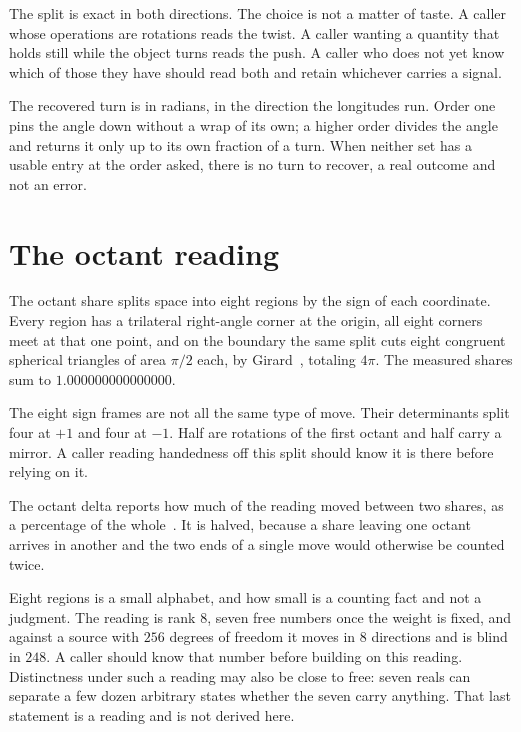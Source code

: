 The split is exact in both directions. The choice is not a matter of taste. A caller whose operations are rotations reads the twist. A caller wanting a quantity that holds still while the object turns reads the push. A caller who does not yet know which of those they have should read both and retain whichever carries a signal.

The recovered turn is in radians, in the direction the longitudes run. Order one pins the angle down without a wrap of its own; a higher order divides the angle and returns it only up to its own fraction of a turn. When neither set has a usable entry at the order asked, there is no turn to recover, a real outcome and not an error.

\section{The octant reading}

The octant share splits space into eight regions by the sign of each coordinate. Every region has a trilateral right-angle corner at the origin, all eight corners meet at that one point, and on the boundary the same split cuts eight congruent spherical triangles of area \(\pi/2\) each, by Girard~\cite[images f58 to f62]{src:Girard-1629}, totaling \(4\pi\). The measured shares sum to \(1.000000000000000\).

The eight sign frames are not all the same type of move. Their determinants split four at \(+1\) and four at \(-1\). Half are rotations of the first octant and half carry a mirror. A caller reading handedness off this split should know it is there before relying on it.

The octant delta reports how much of the reading moved between two shares, as a percentage of the whole~\cite[Section~4.1, Proposition~4.2]{src:Levin-and-Peres-2017}. It is halved, because a share leaving one octant arrives in another and the two ends of a single move would otherwise be counted twice.

Eight regions is a small alphabet, and how small is a counting fact and not a judgment. The reading is rank \(8\), seven free numbers once the weight is fixed, and against a source with \(256\) degrees of freedom it moves in \(8\) directions and is blind in \(248\). A caller should know that number before building on this reading. Distinctness under such a reading may also be close to free: seven reals can separate a few dozen arbitrary states whether the seven carry anything. That last statement is a reading and is not derived here.

